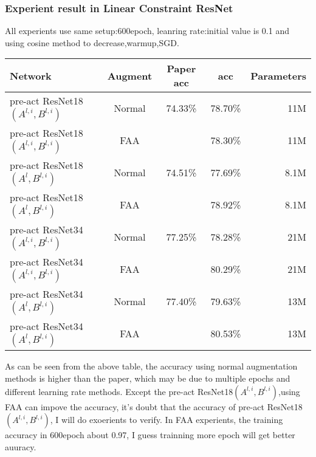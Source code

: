 \subsubsection{Experient result in Linear Constraint ResNet}
All experients use same setup:600epoch, leanring rate:initial value is 0.1 and using cosine method to decrease,warmup,SGD.\\
\begin{tabular}{| l | c | c | c | r |}
	\hline
	Network                            &Augment   & Paper acc &  acc      &  Parameters\\
	\hline
	pre-act ResNet18$(A^{l,i},B^{l,i})$ & Normal   &   74.33\%  & 78.70\%  &   11M\\
	\hline
	pre-act ResNet18$(A^{l,i},B^{l,i})$ &   FAA    &            & 78.30\%  &   11M\\
	\hline
	pre-act ResNet18$(A^l,B^{l,i})$     & Normal   &    74.51\% & 77.69\%  &   8.1M\\
	\hline
	pre-act ResNet18$(A^l,B^{l,i})$     & FAA      &            & 78.92\%  &   8.1M\\
	\hline
	pre-act ResNet34$(A^{l,i},B^{l,i})$ & Normal   &    77.25\% & 78.28\%  &   21M\\
	\hline
	pre-act ResNet34$(A^{l,i},B^{l,i})$ &   FAA    &            & 80.29\%  &   21M\\
	\hline
	pre-act ResNet34$(A^l,B^{l,i})$     & Normal   &   77.40\%  & 79.63\%  &   13M\\
	\hline
	pre-act ResNet34$(A^l,B^{l,i})$     & FAA      &             & 80.53\% &   13M\\
	\hline
\end{tabular}

As can be seen from the above table, the accuracy using normal augmentation methods is higher than the paper, which may be due to multiple epochs and different learning rate methods. Except the pre-act ResNet18$(A^{l,i},B^{l,i})$,using FAA can impove the accuracy, it's doubt that the accuracy of pre-act ResNet18$(A^{l,i},B^{l,i})$, I will do exoerients to verify. In FAA experients, the training accuracy in 600epoch about 0.97, I guess trainning more epoch will get better auuracy.

